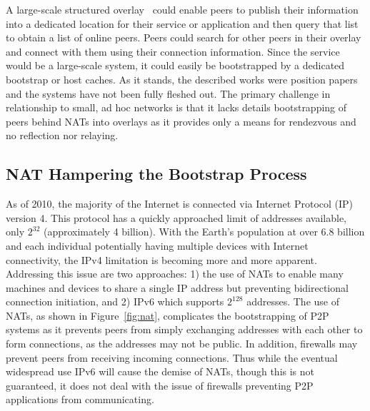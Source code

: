 \documentclass[conference]{IEEEtran}
\begin{document}
A large-scale structured overlay~\cite{one_ring, p2p_bootstrap} could enable
peers to publish their information into a dedicated location for their service
or application and then query that list to obtain a list of online peers.
Peers could search for other peers in their overlay and connect with them using
their connection information.  Since the service would be a large-scale system,
it could easily be bootstrapped by a dedicated bootstrap or host caches.  As it
stands, the described works were position papers and the systems have not been
fully fleshed out.  The primary challenge in relationship to small, ad hoc
networks is that it lacks details bootstrapping of peers behind NATs into
overlays as it provides only a means for rendezvous and no reflection nor
relaying.

\subsection{NAT Hampering the Bootstrap Process}

As of 2010, the majority of the Internet is connected via Internet Protocol
(IP) version 4.  This protocol has a quickly approached limit of addresses
available,  only $2^{32}$ (approximately 4 billion).  With the Earth's
population at over 6.8 billion and each individual potentially having multiple
devices with Internet connectivity, the IPv4 limitation is becoming more and
more apparent.  Addressing this issue are two approaches:  1) the use of NATs
to enable many machines and devices to share a single IP address but preventing
bidirectional connection initiation, and 2) IPv6 which supports $2^{128}$
addresses.  The use of NATs, as shown in Figure~\ref{fig:nat}, complicates the
bootstrapping of P2P systems as it prevents peers from simply exchanging
addresses with each other to form connections, as the addresses may not be
public.  In addition, firewalls may prevent peers from receiving incoming
connections.  Thus while the eventual widespread use IPv6 will cause the demise
of NATs, though this is not guaranteed, it does not deal with the issue of
firewalls preventing P2P applications from communicating.
\end{document}
